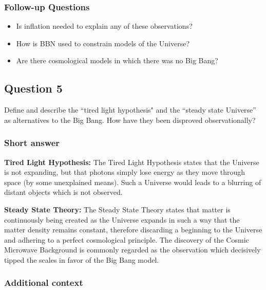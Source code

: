 \documentclass[a4paper,11pt]{article}
\begin{document}
\subsubsection{Follow-up Questions}

\begin{itemize}
    \item Is inflation needed to explain any of these observations?
    \item How is BBN used to constrain models of the Universe?
    \item Are there cosmological models in which there was no Big Bang?
\end{itemize}

%
%

\newpage
\subsection{Question 5}

Define and describe the ``tired light hypothesis" and the ``steady state Universe'' as alternatives to the Big Bang. How have they been disproved observationally?

\subsubsection{Short answer}

{\noindent}\textbf{Tired Light Hypothesis:} The Tired Light Hypothesis states that the Universe is not expanding, but that photons simply lose energy as they move through space (by some unexplained means). Such a Universe would leads to a blurring of distant objects which is not observed.

{\noindent}\textbf{Steady State Theory:} The Steady State Theory states that matter is continuously being created as the Universe expands in such a way that the matter density remains constant, therefore discarding a beginning to the Universe and adhering to a perfect cosmological principle. The discovery of the Cosmic Microwave Background is commonly regarded as the observation which decisively tipped the scales in favor of the Big Bang model.

\subsubsection{Additional context}
\end{document}
